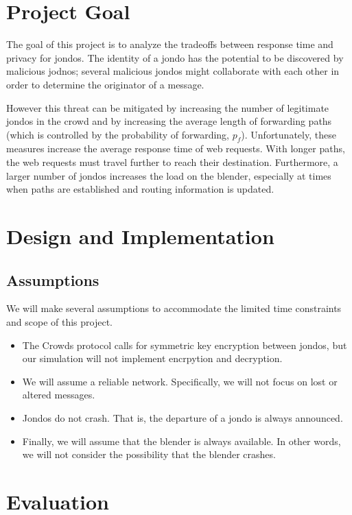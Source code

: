 \documentclass[12pt]{article}
\begin{document}
\section{Project Goal}

The goal of this project is to analyze the tradeoffs between response time
and privacy for jondos. The identity of a jondo has the potential to be
discovered by malicious jodnos; several malicious jondos might collaborate
with each other in order to determine the originator of a message.

However this threat can be mitigated by increasing the number of legitimate
jondos in the crowd and by increasing the average length of forwarding
paths (which is controlled by the probability of forwarding, $p_f$).
Unfortunately, these measures increase the average response time of web
requests. With longer paths, the web requests must travel further to
reach their destination. Furthermore, a larger number of jondos increases the load on
the blender, especially at times when paths are established and routing
information is updated.

\section{Design and Implementation}

\subsection{Assumptions}

We will make several assumptions to accommodate the limited
time constraints and scope of this project.

\begin{itemize}
	\item The Crowds protocol calls for symmetric key encryption between
	jondos, but our simulation will not implement encrpytion and decryption.
	\item We will assume a reliable network. Specifically, we will not
	focus on lost or altered messages.
	\item Jondos do not crash. That is, the departure of a jondo is always
	announced.
	\item Finally, we will assume that the blender is always available.
	In other words, we will not consider the possibility that the blender
	crashes.
\end{itemize}

\section{Evaluation}
\end{document}
